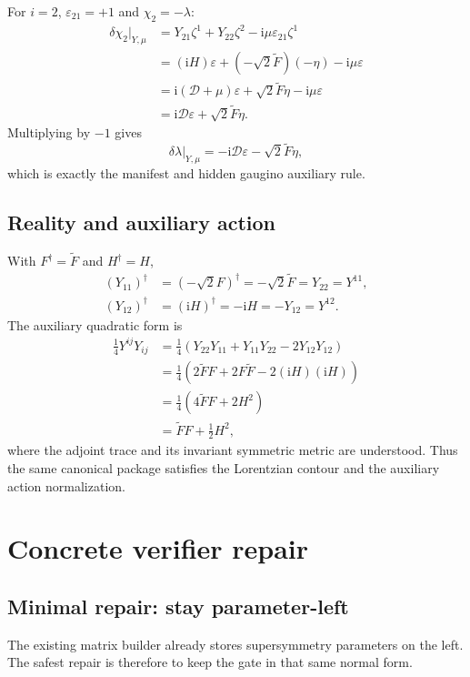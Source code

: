 \documentclass[11pt,a4paper,UTF8]{ctexart}
\numberwithin{equation}{section}
\newcommand{\ii}{\mathrm i}
\newcommand{\eps}{\varepsilon}
\newcommand{\slot}{\big\vert}
\begin{document}
For $i=2$, $\eps_{21}=+1$ and $\chi_2=-\lambda$:
\begin{align}
\delta\chi_2\slot_{Y,\mu}
&=Y_{21}\zeta^1+Y_{22}\zeta^2
-\ii\mu\eps_{21}\zeta^1
\\
&=(\ii H)\eps+(-\sqrt2\widetilde F)(-\eta)
-\ii\mu\eps
\\
&=\ii(\mathscr D+\mu)\eps+\sqrt2\widetilde F\eta-\ii\mu\eps
\\
&=\ii\mathscr D\eps+\sqrt2\widetilde F\eta.
\end{align}
Multiplying by $-1$ gives
\[
\delta\lambda\slot_{Y,\mu}
=-\ii\mathscr D\eps-\sqrt2\widetilde F\eta,
\]
which is exactly the manifest and hidden gaugino auxiliary rule.

\subsection{Reality and auxiliary action}

With $F^\dagger=\widetilde F$ and $H^\dagger=H$,
\begin{align}
(Y_{11})^\dagger
&=(-\sqrt2F)^\dagger
=-\sqrt2\widetilde F
=Y_{22}
=Y^{11},
\\
(Y_{12})^\dagger
&=(\ii H)^\dagger
=-\ii H
=-Y_{12}
=Y^{12}.
\end{align}
The auxiliary quadratic form is
\begin{align}
\frac14Y^{ij}Y_{ij}
&=\frac14\left(Y_{22}Y_{11}+Y_{11}Y_{22}-2Y_{12}Y_{12}\right)
\\
&=\frac14\left(
2\widetilde FF+2F\widetilde F-2(\ii H)(\ii H)
\right)
\\
&=\frac14\left(4\widetilde FF+2H^2\right)
\\
&=\widetilde FF+\frac12H^2,
\end{align}
where the adjoint trace and its invariant symmetric metric are understood. Thus the same canonical package satisfies the Lorentzian contour and the auxiliary action normalization.

\section{Concrete verifier repair}

\subsection{Minimal repair: stay parameter-left}

The existing matrix builder already stores supersymmetry parameters on the left. The safest repair is therefore to keep the gate in that same normal form.
\end{document}
